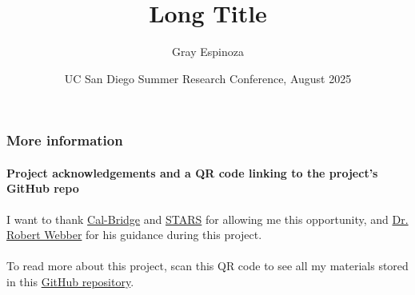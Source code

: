 \documentclass[aspectratio=43]{beamer}
\title[Short Title]{Long Title}
\author{Gray Espinoza}
\institute{California State University,\\Fullerton}
\date[13 August 2025]{UC San Diego Summer Research Conference, August 2025}
\begin{document}
\begin{frame}[plain]
  \titlepage
\end{frame}

\begin{frame}
  \frametitle{More information}
  \framesubtitle{Project acknowledgements and a QR code linking to
  the project's GitHub repo}

  I want to thank \href{https://calbridge.org}{Cal-Bridge} and
  \href{https://grad.ucsd.edu/oar2/oar2office/programs/undergraduate-programs/stars}{STARS}
  for allowing me this opportunity, and
  \href{https://sites.google.com/ucsd.edu/rwebber}{Dr. Robert Webber}
  for his guidance during this project.
  \\~\\

  To read more about this project, scan this QR code to see all my
  materials stored in this
  \href{https://github.com/grayespinoza/cbsp25}{GitHub repository}.
  \\~\\

\end{frame}
\end{document}
